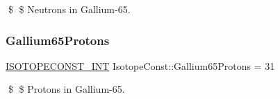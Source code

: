 \$ \$ Neutrons in Gallium-\/65. \mbox{\label{group___isotope_const-_gallium-_ga65_gaae47d9f0ae76ad67304a8da63d361284}} 
\subsubsection{\texorpdfstring{Gallium65\+Protons}{Gallium65Protons}}
{\footnotesize\ttfamily \mbox{\hyperlink{group___isotope_const-_macros_ga5f18360b3e99483a35c32d789e62621c}{I\+S\+O\+T\+O\+P\+E\+C\+O\+N\+S\+T\+\_\+\+I\+NT}} Isotope\+Const\+::\+Gallium65\+Protons = 31}

\$ \$ Protons in Gallium-\/65. 